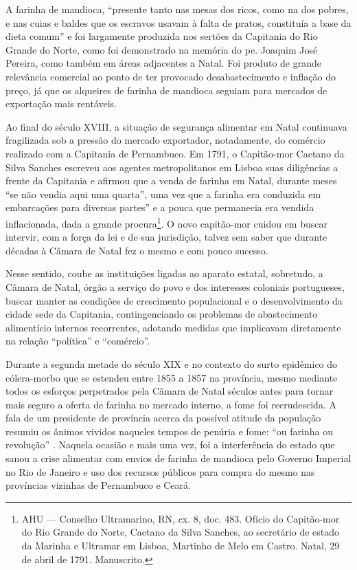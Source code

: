 \begin{refsection}
A farinha de mandioca, “presente tanto nas mesas dos ricos, como na dos pobres, e nas cuias e baldes  que os escravos usavam à falta de pratos, constituía a base da dieta comum” \cite[p.~96]{Barickman2003acucar} e foi largamente produzida nos sertões da Capitania do Rio Grande do Norte, como foi demonstrado na memória do pe. Joaquim José Pereira, como também em áreas adjacentes a Natal. Foi produto de grande relevância comercial ao ponto de ter provocado desabastecimento e inflação do preço, já que os alqueires de farinha de mandioca seguiam para mercados de exportação mais rentáveis.   

Ao final do século XVIII, a situação de segurança alimentar em Natal continuava fragilizada sob a pressão do mercado exportador, notadamente, do comércio realizado com a Capitania de Pernambuco. Em 1791, o Capitão-mor Caetano da Silva Sanches escreveu aos agentes metropolitanos em Lisboa suas diligências a frente da Capitania e afirmou que a venda de farinha em Natal, durante meses “se não vendia aqui uma quarta”, uma vez que a farinha era conduzida em embarcações para diversas partes” e a pouca que permanecia era vendida inflacionada, dada a grande procura\footnote{AHU --- Conselho Ultramarino, RN, cx. 8, doc. 483. Ofício do Capitão-mor do Rio Grande do Norte, Caetano da Silva Sanches, ao secretário de estado da Marinha e Ultramar em Lisboa, Martinho de Melo em Castro. Natal, 29 de abril de 1791. Manuscrito.}. O novo capitão-mor cuidou em buscar intervir, com a força da lei e de sua jurisdição, talvez sem saber que durante décadas à Câmara de Natal fez o mesmo e com pouco sucesso. 

Nesse sentido, coube as instituições ligadas ao aparato estatal, sobretudo, a Câmara de Natal, órgão a serviço do povo e dos interesses coloniais portugueses, buscar manter as condições de crescimento populacional e o desenvolvimento da cidade sede da Capitania, contingenciando os problemas de abastecimento alimentício internos recorrentes, adotando medidas que implicavam diretamente na relação ``política'' e ``comércio''. 

Durante a segunda metade do século XIX e no contexto do surto epidêmico do cólera-morbo que se estendeu entre 1855 a 1857 na província, mesmo mediante todos os esforços perpetrados pela Câmara de Natal séculos antes para tornar mais seguro a oferta de farinha no mercado interno, a fome foi recrudescida. A fala de um presidente de província acerca da possível atitude da população resumiu os ânimos vividos naqueles tempos de penúria e fome: “ou farinha ou revolução” \cite[p.~117]{Monteiro2007terra}. Naquela ocasião e mais uma vez, foi a interferência do estado que sanou a crise alimentar com envios de farinha de mandioca pelo Governo Imperial no Rio de Janeiro e uso dos recursos públicos para compra do mesmo nas províncias vizinhas de Pernambuco e Ceará.


\end{refsection}
